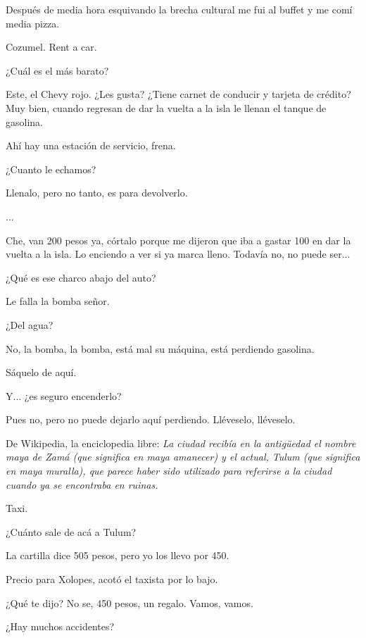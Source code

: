 \documentclass[11pt,twoside,openright,a6paper]{book}
\begin{document}
Después de media hora esquivando la brecha cultural me fui al buffet y me comí media pizza.


\vspace{1.5cm}
Cozumel. Rent a car.

¿Cuál es el más barato?

Este, el Chevy rojo. ¿Les gusta? ¿Tiene carnet de conducir y tarjeta de crédito? Muy bien, cuando regresan de dar la vuelta a la isla le llenan el tanque de gasolina.


\vspace{1.5cm}
Ahí hay una estación de servicio, frena.

¿Cuanto le echamos?

Llenalo, pero no tanto, es para devolverlo.

...

Che, van 200 pesos ya, córtalo porque me dijeron que iba a gastar 100 en dar la vuelta a la isla. Lo enciendo a ver si ya marca lleno. Todavía no, no puede ser...


\vspace{1.5cm}
¿Qué es ese charco abajo del auto?

Le falla la bomba señor.

¿Del agua?

No, la bomba, la bomba, está mal su máquina, está perdiendo gasolina.


\vspace{1.5cm}
Sáquelo de aquí.

Y... ¿es seguro encenderlo?

Pues no, pero no puede dejarlo aquí perdiendo. Lléveselo, lléveselo.


\vspace{1.5cm}
De Wikipedia, la enciclopedia libre: \emph{La ciudad recibía en la antigüedad el nombre maya de Zamá (que significa en maya amanecer) y el actual, Tulum (que significa en maya muralla), que parece haber sido utilizado para referirse a la ciudad cuando ya se encontraba en ruinas.}


\vspace{1.5cm}
Taxi.

¿Cuánto sale de acá a Tulum?

La cartilla dice 505 pesos, pero yo los llevo por 450. 

Precio para Xolopes, acotó el taxista por lo bajo.

¿Qué te dijo? No se, 450 pesos, un regalo. Vamos, vamos.


\vspace{1.5cm}
¿Hay muchos accidentes?
\end{document}
